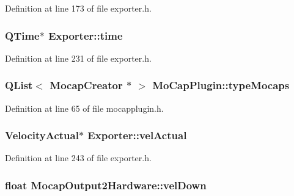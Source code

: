 \-Definition at line 173 of file exporter.\-h.

\hypertarget{group___mo_cap_plugin_gac71372aac301b0f6d2ae67c3a5c4be63}{
\subsubsection[{time}]{\setlength{\rightskip}{0pt plus 5cm}\-Q\-Time$\ast$ {\bf \-Exporter\-::time}}}\label{group___mo_cap_plugin_gac71372aac301b0f6d2ae67c3a5c4be63}


\-Definition at line 231 of file exporter.\-h.

\hypertarget{group___mo_cap_plugin_gaca68fd324d804c3124d7ba64b5d0294a}{
\subsubsection[{type\-Mocaps}]{\setlength{\rightskip}{0pt plus 5cm}\-Q\-List$<$ {\bf \-Mocap\-Creator} $\ast$ $>$ {\bf \-Mo\-Cap\-Plugin\-::type\-Mocaps}}}\label{group___mo_cap_plugin_gaca68fd324d804c3124d7ba64b5d0294a}


\-Definition at line 65 of file mocapplugin.\-h.

\hypertarget{group___mo_cap_plugin_gaf7dc7b4cb9c561edf9c8df28131eeac3}{
\subsubsection[{vel\-Actual}]{\setlength{\rightskip}{0pt plus 5cm}\-Velocity\-Actual$\ast$ {\bf \-Exporter\-::vel\-Actual}}}\label{group___mo_cap_plugin_gaf7dc7b4cb9c561edf9c8df28131eeac3}


\-Definition at line 243 of file exporter.\-h.

\hypertarget{group___mo_cap_plugin_ga2ffad0e2c72a914bb6f9ff031aeb9b79}{
\subsubsection[{vel\-Down}]{\setlength{\rightskip}{0pt plus 5cm}float {\bf \-Mocap\-Output2\-Hardware\-::vel\-Down}}}\label{group___mo_cap_plugin_ga2ffad0e2c72a914bb6f9ff031aeb9b79}


